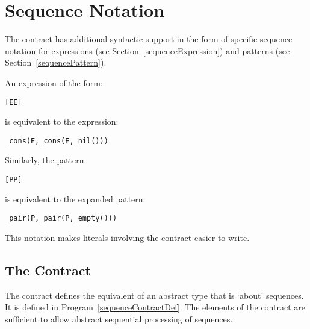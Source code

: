 \section{Sequence Notation}
\label{sequenceNotation}
The  contract has additional syntactic support in the form of specific sequence notation for expressions (see Section~\vref{sequenceExpression}) and patterns (see Section~\vref{sequencePattern}).

An expression of the form:
\begin{alltt}
[E\sequence{,}E\subn]
\end{alltt}
is equivalent to the expression:
\begin{alltt}
\_cons(E,\sequence{}\_cons(E\subn,\_nil())\sequence{})
\end{alltt}
Similarly, the pattern:
\begin{alltt}
[P\sequence{,}P\subn]
\end{alltt}is equivalent to the expanded pattern:
\begin{alltt}
\_pair(P,\sequence{}\_pair(P\subn,\_empty())\sequence{})
\end{alltt}
This notation makes literals involving the  contract easier to write.

\subsection{The  Contract}
\label{sequenceContract}
The  contract defines the equivalent of an abstract type that is `about' sequences. It is defined in Program~\vref{sequenceContractDef}. The elements of the  contract are sufficient to allow abstract sequential processing of sequences.

